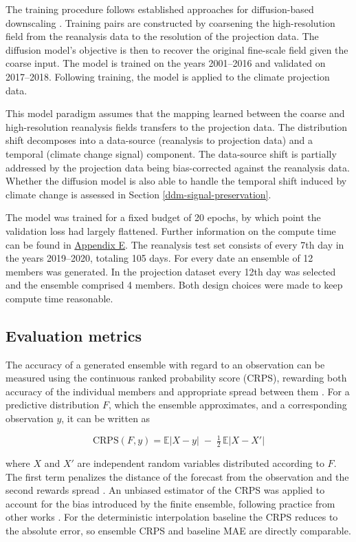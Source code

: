 \documentclass[
]{krantz}
\begin{document}
The training procedure follows established approaches for diffusion-based downscaling \citep{watt2024, addison2026}.
Training pairs are constructed by coarsening the high-resolution field from the reanalysis data to the resolution of the projection data. The diffusion model's objective is then to recover the
original fine-scale field given the coarse input. The model is trained on the years 2001--2016 and validated on 2017--2018.
Following training, the model is applied to the climate projection data.

This model paradigm assumes that the mapping learned between the coarse and high-resolution reanalysis fields transfers
to the projection data. The distribution shift decomposes into a data-source (reanalysis to projection data) and a temporal (climate change signal) component.
The data-source shift is partially addressed by the projection data being bias-corrected against the reanalysis data.
Whether the diffusion model is also able to handle the temporal shift induced by climate change is assessed in Section \ref{ddm-signal-preservation}.

The model was trained for a fixed budget of 20 epochs, by which point the validation loss had largely flattened.
Further information on the compute time can be found in \hyperref[ddm-appendix-e]{Appendix E}.
The reanalysis test set consists of every 7th day in the years 2019--2020, totaling 105 days. For every date an ensemble of 12 members was generated.
In the projection dataset every 12th day was selected and the ensemble comprised 4 members. Both design choices were made to keep compute time reasonable.

\subsection{Evaluation metrics}\label{ddm-evaluation-metrics}

The accuracy of a generated ensemble with regard to an observation can be measured using the continuous ranked probability score (CRPS), rewarding both accuracy of the individual members and appropriate spread between them \citep{gneiting2007}.
For a predictive distribution \(F\), which the ensemble approximates, and a corresponding observation \(y\), it can be written as

\[
\mathrm{CRPS}(F, y) = \mathbb{E}\lvert X - y \rvert \;-\; \tfrac{1}{2}\, \mathbb{E}\lvert X - X' \rvert
\]

where \(X\) and \(X'\) are independent random variables distributed according to \(F\).
The first term penalizes the distance of the forecast from the observation and the second rewards spread \citep{gneiting2007}.
An unbiased estimator of the CRPS was applied to account for the bias introduced by the finite ensemble, following practice from other works \citep{mardani2025, addison2026}.
For the deterministic interpolation baseline the CRPS reduces to the absolute error, so ensemble CRPS and baseline MAE are directly comparable.
\end{document}
